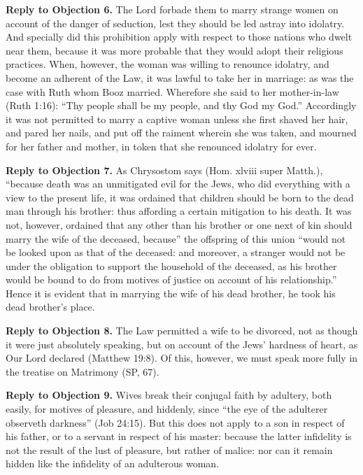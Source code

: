 \textbf{Reply to Objection 6.} The Lord forbade them to marry strange women on account of the danger of seduction, lest they should be led astray into idolatry. And specially did this prohibition apply with respect to those nations who dwelt near them, because it was more probable that they would adopt their religious practices. When, however, the woman was willing to renounce idolatry, and become an adherent of the Law, it was lawful to take her in marriage: as was the case with Ruth whom Booz married. Wherefore she said to her mother-in-law (Ruth 1:16): ``Thy people shall be my people, and thy God my God.'' Accordingly it was not permitted to marry a captive woman unless she first shaved her hair, and pared her nails, and put off the raiment wherein she was taken, and mourned for her father and mother, in token that she renounced idolatry for ever.

\textbf{Reply to Objection 7.} As Chrysostom says (Hom. xlviii super Matth.), ``because death was an unmitigated evil for the Jews, who did everything with a view to the present life, it was ordained that children should be born to the dead man through his brother: thus affording a certain mitigation to his death. It was not, however, ordained that any other than his brother or one next of kin should marry the wife of the deceased, because'' the offspring of this union ``would not be looked upon as that of the deceased: and moreover, a stranger would not be under the obligation to support the household of the deceased, as his brother would be bound to do from motives of justice on account of his relationship.'' Hence it is evident that in marrying the wife of his dead brother, he took his dead brother's place.

\textbf{Reply to Objection 8.} The Law permitted a wife to be divorced, not as though it were just absolutely speaking, but on account of the Jews' hardness of heart, as Our Lord declared (Matthew 19:8). Of this, however, we must speak more fully in the treatise on Matrimony (SP, 67).

\textbf{Reply to Objection 9.} Wives break their conjugal faith by adultery, both easily, for motives of pleasure, and hiddenly, since ``the eye of the adulterer observeth darkness'' (Job 24:15). But this does not apply to a son in respect of his father, or to a servant in respect of his master: because the latter infidelity is not the result of the lust of pleasure, but rather of malice: nor can it remain hidden like the infidelity of an adulterous woman.


